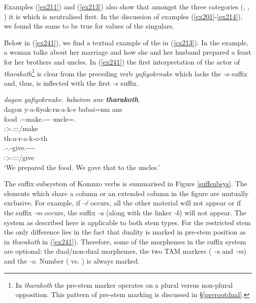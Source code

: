 Examples (\ref{ex211}) and (\ref{ex213}) also show that amongst the three categories (, , ) it is  which is neutralised first. In the discussion of examples (\ref{ex201}-\ref{ex214}), we found the same to be true for  values of the singulars.%

Below in (\ref{ex241}), we find a textual example of the   in (\ref{ex213}). In the example, a woman talks about her marriage and how she and her husband prepared a feast for her brothers and uncles. In (\ref{ex241}) the first  interpretation of the actor of \emph{tharakoth}\footnote{In \emph{tharakoth} the pre-stem marker operates on a plural versus non-plural opposition. This pattern of pre-stem marking is discussed in \S{}\ref{prerootdual}.} is clear from the preceding verb \emph{yafiyokrnake} which lacks the  \emph{-o} suffix and, thus, is inflected with the first  \emph{-e} suffix.

\begin{exe}
	\ex \emph{dagon yafiyokrnake. babainm ane \textbf{tharakoth}.}\\
	\glll dagon y-a-fiyok-rn-a-k-e babai=nm ane\\
	food \Tsg.\Masc-\Vc-make.\Ext-\Pst-\Lk-\Fnsg{} uncle=\Dat.\Nsg{} \Dem{}\\
	{} \footnotesize{\Fdu:\Sbj>\Tsg.\Masc:\Obj:\Pst:\Ipfv/make} {} {}\\
	\sn
	\glll th-a-r-a-k-o-th\\
	\Stnsg.\Gam-\Vc.\Du-give.\Rs-\Pst-\Lk-\Andat-\Nsg\\
	\footnotesize{\Fdu:\Sbj>\Stpl:\Io:\Pst:\Pfv:\Andat/give}\\
	\trans `We prepared the food. We gave that to the uncles.'
	\label{ex241}
\end{exe}

The suffix subsystem of Komnzo verbs is summarised in Figure \ref{suffsubsys}. The elements which share a column or an extended column in the figure are mutually exclusive. For example, if \emph{-é} occurs, all the other material will not appear or if the  suffix \emph{-m} occurs, the  suffix \emph{-a} (along with the linker \emph{-k}) will not appear. The system as described here is applicable to both stem types. For the restricted stem the only difference lies in the fact that duality is marked in pre-stem position as in \emph{tharakoth} in (\ref{ex241}). Therefore, some of the morphemes in the suffix system are optional: the dual/non-dual morphemes, the two TAM markers (\Pst{} \emph{-a} and \Dur{} \emph{-m}) and the  \emph{-o}. Number (\Sg{} vs. \Nsg) is always marked.

